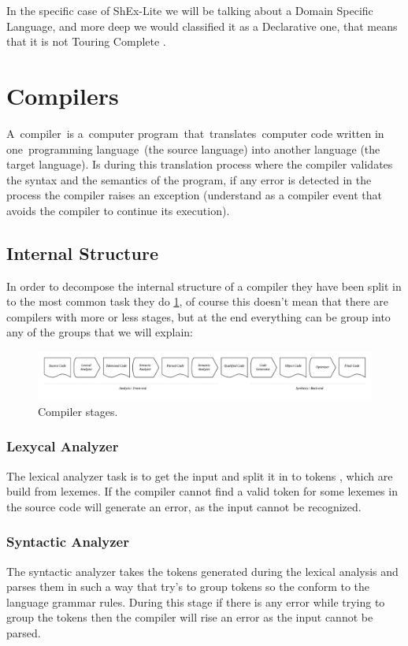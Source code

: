 In the specific case of ShEx-Lite we will be talking about a Domain Specific Language, and more deep we would classified
it as a Declarative one, that means that it is not Touring Complete \cite{touring-complete}.


\section{Compilers}
A compiler is a computer program that translates computer code written in one programming language (the source language)
into another language (the target language). Is during this translation process where the compiler validates the syntax
and the semantics of the program, if any error is detected in the process the compiler raises an exception (understand
as a compiler event that avoids the compiler to continue its execution).

\subsection{Internal Structure}
In order to decompose the internal structure of a compiler they have been split in to the most common task they do
\cref{fig:compiler-stages}, of course this doesn’t mean that there are compilers with more or less stages, but at the
end everything can be group into any of the groups that we will explain:

\begin{figure}
  \includegraphics[width=\textwidth]{images/compiler-stages.pdf}
  \centering
  \caption[Compiler stages]{Compiler stages.}
  \label{fig:compiler-stages}
\end{figure}

\subsubsection{Lexycal Analyzer}
The lexical analyzer task is to get the input and split it in to tokens \cite{lexical-analysis}, which are build
from lexemes. If the compiler cannot find a valid token for some lexemes in the source code will generate an error,
as the input cannot be recognized.

\subsubsection{Syntactic Analyzer}
The syntactic analyzer takes the tokens generated during the lexical analysis and parses them in such a way that try’s
to group tokens so the conform to the language grammar rules. During this stage if there is any error while trying to
group the tokens then the compiler will rise an error as the input cannot be parsed.

